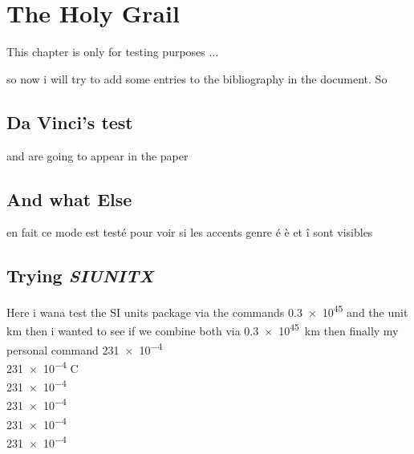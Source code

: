 \chapter*{The Holy Grail}
This chapter is only for testing purposes ...
\minitoc
\newpage

so now i will try to add some entries to the bibliography in the document. So  %
\section{Da Vinci's test}
\cite{auburtin_determination_1998} and \cite{carozzani_direct_2013} are going to appear in the paper 

\section{And what Else}
en fait ce mode est testé pour voir si les accents genre é è et î sont visibles


\section{Trying \emph{SIUNITX}}
Here i wana test the SI units package via the commands \num{.3e45} and the unit \si{\kilo\metre}
then i wanted to see if we combine both via \SI{.3e45}{\kilo\metre} then finally my personal command
\SI{231e-4}{\acceleration} \\
\SI{231e-4}{\composition} C \\
\SI{231e-4}{\velocity} \\
\SI{231e-4}{\conductivity} \\
\SI{231e-4}{\masscapacity} \\
\SI{231e-4}{\volumecapacity} \\
